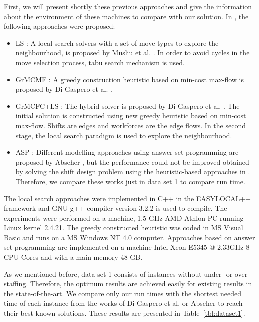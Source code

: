 First, we will present shortly these previous approaches and give the information about the environment of these machines to compare with our solution. In \cite{li:2004:musliu} \cite{li:2007:gaspero} \cite{li:2010:abseher} , the following approaches were proposed:
\begin{itemize}

\item LS :  A local search solvers with a set of move types to explore the neighbourhood, is proposed by Musliu et al. \cite{li:2004:musliu}. In order to avoid cycles in the move selection process, tabu search mechanism is used. 

\item GrMCMF : A greedy construction heuristic based on min-cost max-flow is proposed by  Di Gaspero et al. \cite{li:2007:gaspero}. 

\item GrMCFC+LS : The hybrid solver is proposed by  Di Gaspero et al. \cite{li:2007:gaspero}.  The initial solution is constructed using new greedy heuristic based on min-cost max-flow. Shifts are edges and workforces are the edge flows. In the second stage, the local search paradigm is used to explore the neighbourhood. 
\item ASP : Different modelling approaches using answer set programming are proposed by Abseher \cite{li:2010:abseher}, but the performance could not be improved obtained by solving the shift design problem using the heuristic-based approaches in \cite{li:2007:gaspero}. Therefore, we compare these works just in data set 1 to compare run time.


\end{itemize}

The local search approaches were implemented in C++ in the EASYLOCAL++ framework and GNU g++ compiler version 3.2.2 is used to compile. The experiments were performed on a machine, 1.5 GHz AMD Athlon PC running Linux kernel 2.4.21. The greedy constructed heuristic was coded in MS Visual Basic and runs on a MS Windows NT 4.0 computer. Approaches based on answer set programming are implemented on a machine Intel Xeon E5345 @ 2.33GHz 8 CPU-Cores and with a main memory 48 GB.

As we mentioned before, data set 1 consists of instances without under- or over-staffing. Therefore, the optimum results are achieved easily for existing results in the state-of-the-art. We compare only our run times with the shortest needed time of each instance from the works of Di Gaspero et al. \cite{li:2007:gaspero} or Abseher \cite{li:2010:abseher} to reach their best known solutions. These results are presented in Table~\ref{tbl:dataset1}. 

